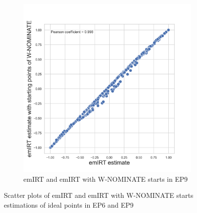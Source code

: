 \documentclass[a4paper,12pt]{report}
\begin{document}
\begin{figure}[H]
\begin{subfigure}[b]{0.48\textwidth}
                        \includegraphics[width=\textwidth]{Graphs/ScatterEMEIGEN9}
                        \caption{emIRT and emIRT with W-NOMINATE starts in EP9}
                        \label{fig:EMEIGEN_SCATTER_9}
                    \end{subfigure}
                    \caption
                    {Scatter plots of emIRT and emIRT with W-NOMINATE starts estimations of ideal points in EP6 and EP9}
                    \label{fig:EMEIGEN_SCATTER_6_9}
                \end{figure}
\end{document}
